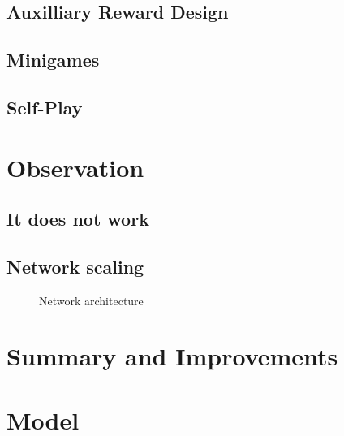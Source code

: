 \documentclass[12pt]{article}
\begin{document}
\subsection{Auxilliary Reward Design}

\subsection{Minigames} %

\subsection{Self-Play} %

\section{Observation}
\subsection{It does not work}
\subsection{Network scaling} %

\begin{figure}
  \centering
  
  \caption{Network architecture}
\end{figure}


\section{Summary and Improvements}






\section{Model}
\end{document}
